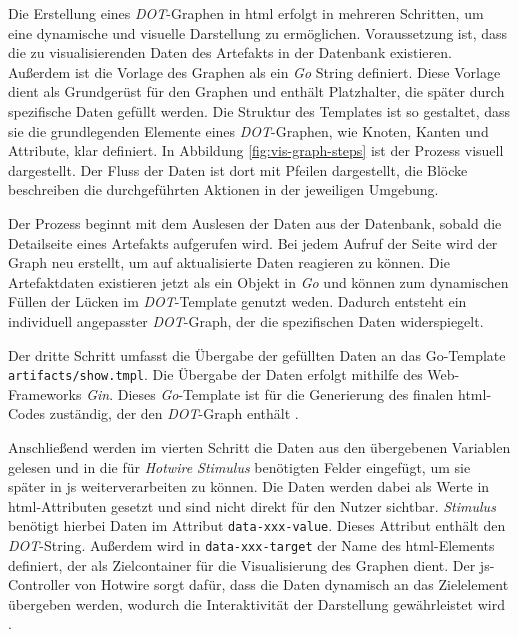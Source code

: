Die Erstellung eines \textit{DOT}-Graphen in \gls{html} erfolgt in mehreren Schritten, um eine dynamische und visuelle Darstellung zu ermöglichen. Voraussetzung ist, dass die zu visualisierenden Daten des Artefakts in der Datenbank existieren. Außerdem ist die Vorlage des Graphen als ein \textit{Go} String definiert. Diese Vorlage dient als Grundgerüst für den Graphen und enthält Platzhalter, die später durch spezifische Daten gefüllt werden. Die Struktur des Templates ist so gestaltet, dass sie die grundlegenden Elemente eines \textit{DOT}-Graphen, wie Knoten, Kanten und Attribute, klar definiert. In Abbildung \ref{fig:vis-graph-steps} ist der Prozess visuell dargestellt. Der Fluss der Daten ist dort mit Pfeilen dargestellt, die Blöcke beschreiben die durchgeführten Aktionen in der jeweiligen Umgebung.

Der Prozess beginnt mit dem Auslesen der Daten aus der Datenbank, sobald die Detailseite eines Artefakts aufgerufen wird. Bei jedem Aufruf der Seite wird der Graph neu erstellt, um auf aktualisierte Daten reagieren zu können. Die Artefaktdaten existieren jetzt als ein Objekt in \textit{Go} und können zum dynamischen Füllen der Lücken im \textit{DOT}-Template genutzt weden. Dadurch entsteht ein individuell angepasster \textit{DOT}-Graph, der die spezifischen Daten widerspiegelt.

Der dritte Schritt umfasst die Übergabe der gefüllten Daten an das Go-Template \verb|artifacts/show.tmpl|. Die Übergabe der Daten erfolgt mithilfe des Web-Frameworks \textit{Gin}. Dieses \textit{Go}-Template ist für die Generierung des finalen \gls{html}-Codes zuständig, der den \textit{DOT}-Graph enthält \autocite{GingonicGinGin}.

Anschließend werden im vierten Schritt die Daten aus den übergebenen Variablen gelesen und in die für \textit{Hotwire Stimulus} benötigten Felder eingefügt, um sie später in \gls{js} weiterverarbeiten zu können. Die Daten werden dabei als Werte in \gls{html}-Attributen gesetzt und sind nicht direkt für den Nutzer sichtbar. \textit{Stimulus} benötigt hierbei Daten im Attribut \verb|data-xxx-value|. Dieses Attribut enthält den \textit{DOT}-String. Außerdem wird in \verb|data-xxx-target| der Name des \gls{html}-Elements definiert, der als Zielcontainer für die Visualisierung des Graphen dient. Der \gls{js}-Controller von Hotwire sorgt dafür, dass die Daten dynamisch an das Zielelement übergeben werden, wodurch die Interaktivität der Darstellung gewährleistet wird \autocite{StimulusReference}.

